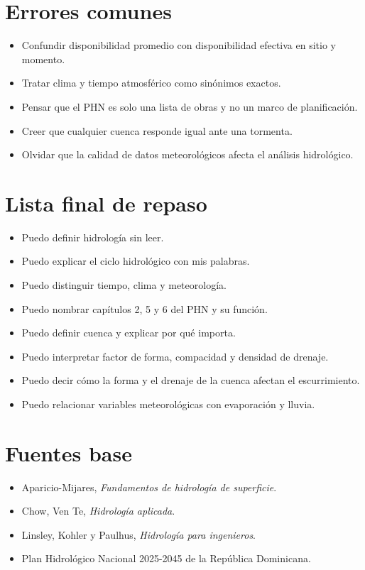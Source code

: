 \documentclass[11pt]{article}
\begin{document}
\section{Errores comunes}
\begin{warnbox}
\begin{itemize}
\item Confundir disponibilidad promedio con disponibilidad efectiva en sitio y momento.
\item Tratar clima y tiempo atmosférico como sinónimos exactos.
\item Pensar que el PHN es solo una lista de obras y no un marco de planificación.
\item Creer que cualquier cuenca responde igual ante una tormenta.
\item Olvidar que la calidad de datos meteorológicos afecta el análisis hidrológico.
\end{itemize}
\end{warnbox}

\section{Lista final de repaso}
\begin{itemize}
\item Puedo definir hidrología sin leer.
\item Puedo explicar el ciclo hidrológico con mis palabras.
\item Puedo distinguir tiempo, clima y meteorología.
\item Puedo nombrar capítulos 2, 5 y 6 del PHN y su función.
\item Puedo definir cuenca y explicar por qué importa.
\item Puedo interpretar factor de forma, compacidad y densidad de drenaje.
\item Puedo decir cómo la forma y el drenaje de la cuenca afectan el escurrimiento.
\item Puedo relacionar variables meteorológicas con evaporación y lluvia.
\end{itemize}

\section{Fuentes base}
\begin{itemize}
\item Aparicio-Mijares, \emph{Fundamentos de hidrología de superficie}.
\item Chow, Ven Te, \emph{Hidrología aplicada}.
\item Linsley, Kohler y Paulhus, \emph{Hidrología para ingenieros}.
\item Plan Hidrológico Nacional 2025-2045 de la República Dominicana.
\end{itemize}
\end{document}
